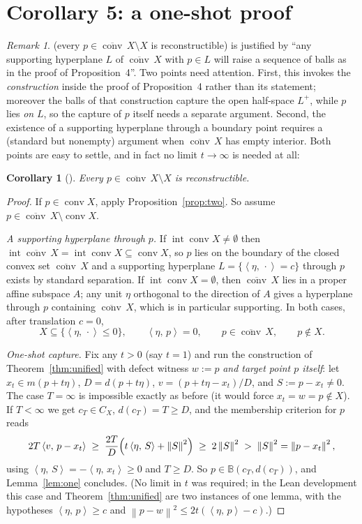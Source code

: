 \documentclass[11pt]{article}
\newtheorem{corollary}[theorem]{Corollary}
\theoremstyle{remark}
\newtheorem{remark}[theorem]{Remark}
\newcommand{\B}{\mathbb{B}}
\newcommand{\X}{X}
\newcommand{\conv}{\operatorname{conv}}
\newcommand{\cconv}[1]{\overline{\conv}\,#1}
\newcommand{\sca}[2]{\left\langle #1,\, #2\right\rangle}
\newcommand{\norm}[1]{\left\lVert #1\right\rVert}
\newcommand{\Cx}{C_{\X}}
\begin{document}
\section{Corollary 5: a one-shot proof}\label{sec:cor5}

\begin{remark}
\cite[Corollary~5]{Bia} (every $p\in\cconv\X\setminus \X$ is reconstructible) is justified by
``any supporting hyperplane $L$ of $\cconv \X$ with $p\in L$ will raise a sequence of balls as
in the proof of Proposition~4''. Two points need attention. First, this invokes the
\emph{construction} inside the proof of Proposition~4 rather than its statement; moreover the
balls of that construction capture the open half-space $L^{+}$, while $p$ lies \emph{on} $L$, so
the capture of $p$ itself needs a separate argument. Second, the existence of a supporting
hyperplane through a boundary point requires a (standard but nonempty) argument when
$\cconv \X$ has empty interior. Both points are easy to settle, and in fact no limit
$t\to\infty$ is needed at all:
\end{remark}

\begin{corollary}[{\cite[Corollary~5]{Bia}}]\label{cor:five}
Every $p\in\cconv \X\setminus \X$ is reconstructible.
\end{corollary}

\begin{proof}
If $p\in\conv \X$, apply Proposition~\ref{prop:two}. So assume $p\in\cconv\X\setminus\conv\X$.

\emph{A supporting hyperplane through $p$.} If $\operatorname{int}\conv \X\neq\emptyset$ then
$\operatorname{int}\cconv\X=\operatorname{int}\conv \X\subseteq\conv\X$, so $p$ lies on the
boundary of the closed convex set $\cconv \X$ and a supporting hyperplane
$L=\{\sca{\eta}{\cdot}=c\}$ through $p$ exists by standard separation. If
$\operatorname{int}\conv \X=\emptyset$, then $\cconv \X$ lies in a proper affine subspace $A$;
any unit $\eta$ orthogonal to the direction of $A$ gives a hyperplane through $p$ containing
$\cconv\X$, which is in particular supporting. In both cases, after translation $c=0$,
\[
 \X\subseteq\{\sca{\eta}{\cdot}\le0\},\qquad \sca{\eta}{p}=0,\qquad p\in\cconv\X,\qquad
 p\notin \X .
\]

\emph{One-shot capture.} Fix any $t>0$ (say $t=1$) and run the construction of
Theorem~\ref{thm:unified} with defect witness $w:=p$ \emph{and target point $p$ itself}: let
$x_t\in m(p+t\eta)$, $D=d(p+t\eta)$, $v=(p+t\eta-x_t)/D$, and $S:=p-x_t\neq0$. The case
$T=\infty$ is impossible exactly as before (it would force $x_t=w=p\notin \X$). If $T<\infty$
we get $c_T\in\Cx$, $d(c_T)=T\ge D$, and the membership criterion for $p$ reads
\[
 2T\sca{v}{p-x_t}\;\ge\;\frac{2T}{D}\Bigl(t\sca{\eta}{S}+\norm S^2\Bigr)
 \;\ge\;2\norm S^2\;>\;\norm S^2=\norm{p-x_t}^2,
\]
using $\sca{\eta}{S}=-\sca{\eta}{x_t}\ge0$ and $T\ge D$. So $p\in\B(c_T,d(c_T))$, and
Lemma~\ref{lem:one} concludes. (No limit in $t$ was required; in the Lean development this case
and Theorem~\ref{thm:unified} are two instances of one lemma, with the hypotheses
$\sca{\eta}{p}\ge c$ and $\norm{p-w}^2\le 2t(\sca{\eta}{p}-c)$.)
\end{proof}
\end{document}
